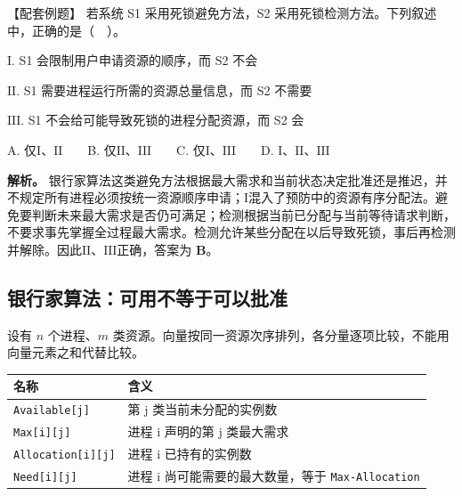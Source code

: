 \begin{example}[配套例题]

【配套例题】 若系统 S1 采用死锁避免方法，S2 采用死锁检测方法。下列叙述中，正确的是（　）。

\ensuremath{\mathrm{I}}. S1 会限制用户申请资源的顺序，而 S2 不会

\ensuremath{\mathrm{II}}. S1 需要进程运行所需的资源总量信息，而 S2 不需要

\ensuremath{\mathrm{III}}. S1 不会给可能导致死锁的进程分配资源，而 S2 会

A. 仅\ensuremath{\mathrm{I}}、\ensuremath{\mathrm{II}}　　B. 仅\ensuremath{\mathrm{II}}、\ensuremath{\mathrm{III}}　　C. 仅\ensuremath{\mathrm{I}}、\ensuremath{\mathrm{III}}　　D. \ensuremath{\mathrm{I}}、\ensuremath{\mathrm{II}}、\ensuremath{\mathrm{III}}

\end{example}

\textbf{解析。} 银行家算法这类避免方法根据最大需求和当前状态决定批准还是推迟，并不规定所有进程必须按统一资源顺序申请；\ensuremath{\mathrm{I}}混入了预防中的资源有序分配法。避免要判断未来最大需求是否仍可满足；检测根据当前已分配与当前等待请求判断，不要求事先掌握全过程最大需求。检测允许某些分配在以后导致死锁，事后再检测并解除。因此\ensuremath{\mathrm{II}}、\ensuremath{\mathrm{III}}正确，答案为 \textbf{B}。

\subsection{银行家算法：可用不等于可以批准}\label{OS02-4-3}

设有 \(n\) 个进程、\(m\) 类资源。向量按同一资源次序排列，各分量逐项比较，不能用向量元素之和代替比较。

\begin{wideblock}

\par\medskip\noindent\begin{minipage}{\linewidth}\fontsize{9.3}{12}\selectfont\begin{tabularx}{\linewidth}{@{}YY@{}}
\toprule\noalign{}
名称 & 含义 \\
\midrule\noalign{}


\texttt{Available[j]} & 第 j 类当前未分配的实例数 \\
\texttt{Max[i][j]} & 进程 i 声明的第 j 类最大需求 \\
\texttt{Allocation[i][j]} & 进程 i 已持有的实例数 \\
\texttt{Need[i][j]} & 进程 i 尚可能需要的最大数量，等于 \texttt{Max-Allocation} \\
\bottomrule\end{tabularx}
\end{minipage}\par\medskip

\end{wideblock}

